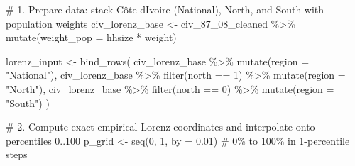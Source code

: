 \documentclass[
  letterpaper,
  DIV=11,
  numbers=noendperiod]{scrartcl}
\newenvironment{Shaded}{\begin{snugshade}}{\end{snugshade}}
\newcommand{\AttributeTok}[1]{\textcolor[rgb]{0.40,0.45,0.13}{#1}}
\newcommand{\CommentTok}[1]{\textcolor[rgb]{0.37,0.37,0.37}{#1}}
\newcommand{\DecValTok}[1]{\textcolor[rgb]{0.68,0.00,0.00}{#1}}
\newcommand{\FloatTok}[1]{\textcolor[rgb]{0.68,0.00,0.00}{#1}}
\newcommand{\FunctionTok}[1]{\textcolor[rgb]{0.28,0.35,0.67}{#1}}
\newcommand{\NormalTok}[1]{\textcolor[rgb]{0.00,0.23,0.31}{#1}}
\newcommand{\OtherTok}[1]{\textcolor[rgb]{0.00,0.23,0.31}{#1}}
\newcommand{\SpecialCharTok}[1]{\textcolor[rgb]{0.37,0.37,0.37}{#1}}
\newcommand{\StringTok}[1]{\textcolor[rgb]{0.13,0.47,0.30}{#1}}
\begin{document}
\begin{Shaded}
\begin{Highlighting}[]
\CommentTok{\# 1. Prepare data: stack Côte d\textquotesingle{}Ivoire (National), North, and South with population weights}
\NormalTok{civ\_lorenz\_base }\OtherTok{\textless{}{-}}\NormalTok{ civ\_87\_08\_cleaned }\SpecialCharTok{\%\textgreater{}\%}
  \FunctionTok{mutate}\NormalTok{(}\AttributeTok{weight\_pop =}\NormalTok{ hhsize }\SpecialCharTok{*}\NormalTok{ weight)}

\NormalTok{lorenz\_input }\OtherTok{\textless{}{-}} \FunctionTok{bind\_rows}\NormalTok{(}
\NormalTok{  civ\_lorenz\_base }\SpecialCharTok{\%\textgreater{}\%} \FunctionTok{mutate}\NormalTok{(}\AttributeTok{region =} \StringTok{"National"}\NormalTok{),}
\NormalTok{  civ\_lorenz\_base }\SpecialCharTok{\%\textgreater{}\%} \FunctionTok{filter}\NormalTok{(north }\SpecialCharTok{==} \DecValTok{1}\NormalTok{) }\SpecialCharTok{\%\textgreater{}\%} \FunctionTok{mutate}\NormalTok{(}\AttributeTok{region =} \StringTok{"North"}\NormalTok{),}
\NormalTok{  civ\_lorenz\_base }\SpecialCharTok{\%\textgreater{}\%} \FunctionTok{filter}\NormalTok{(north }\SpecialCharTok{==} \DecValTok{0}\NormalTok{) }\SpecialCharTok{\%\textgreater{}\%} \FunctionTok{mutate}\NormalTok{(}\AttributeTok{region =} \StringTok{"South"}\NormalTok{)}
\NormalTok{)}

\CommentTok{\# 2. Compute exact empirical Lorenz coordinates and interpolate onto percentiles 0..100}
\NormalTok{p\_grid }\OtherTok{\textless{}{-}} \FunctionTok{seq}\NormalTok{(}\DecValTok{0}\NormalTok{, }\DecValTok{1}\NormalTok{, }\AttributeTok{by =} \FloatTok{0.01}\NormalTok{) }\CommentTok{\# 0\% to 100\% in 1{-}percentile steps}


\end{Highlighting}
\end{Shaded}
\end{document}
